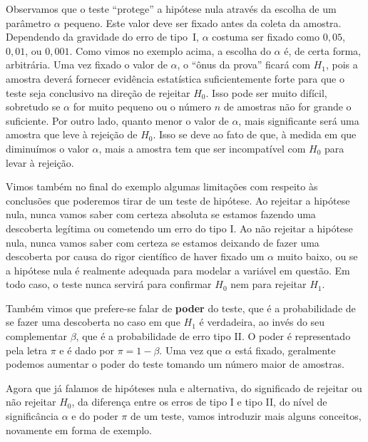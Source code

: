 \documentclass[12pt,a4paper]{article}
\theoremstyle{plain}
\theoremstyle{definition}
\theoremstyle{remark}
\begin{document}
Observamos que o teste ``protege'' a hipótese nula através da escolha de um parâmetro $\alpha$ pequeno.
Este valor deve ser fixado antes da coleta da amostra.
Dependendo da gravidade do erro de tipo~I, $\alpha$ costuma ser fixado como
$0,05$, $0,01$, ou $0,001$.
Como vimos no exemplo acima, a escolha do $\alpha$ é, de certa forma, arbitrária.
Uma vez fixado o valor de $\alpha$, o ``ônus da prova'' ficará com $H_1$, pois a amostra deverá fornecer evidência estatística suficientemente forte para que o teste seja conclusivo na direção de rejeitar $H_0$.
Isso pode ser muito difícil, sobretudo se $\alpha$ for muito pequeno ou o número $n$ de amostras não for grande o suficiente.
Por outro lado, quanto menor o valor de $\alpha$, mais significante será uma amostra que leve à rejeição de $H_0$. Isso se deve ao fato de que, à medida em que diminuímos o valor $\alpha$, mais a amostra tem que ser incompatível com $H_0$ para levar à rejeição.

Vimos também no final do exemplo algumas limitações com respeito às conclusões que poderemos tirar de um teste de hipótese.
Ao rejeitar a hipótese nula, nunca vamos saber com certeza absoluta se estamos fazendo uma descoberta legítima ou cometendo um erro do tipo I.
Ao não rejeitar a hipótese nula, nunca vamos saber com certeza se estamos deixando de fazer uma descoberta por causa do rigor científico de haver fixado um $\alpha$ muito baixo, ou se a hipótese nula é realmente adequada para modelar a variável em questão.
Em todo caso, o teste nunca servirá para confirmar $H_0$ nem para rejeitar $H_1$.

Também vimos que prefere-se falar de \textbf{poder} do teste, que é a probabilidade de se fazer uma descoberta no caso em que $H_1$ é verdadeira, ao invés do seu complementar $\beta$, que é a probabilidade de erro tipo II.
O poder é representado pela letra $\pi$ e é dado por $\pi = 1-\beta$.
Uma vez que $\alpha$ está fixado, geralmente podemos aumentar o poder do teste tomando um número maior de amostras.

Agora que já falamos de hipóteses nula e alternativa, do significado de rejeitar ou não rejeitar $H_0$, da diferença entre os erros de tipo I e tipo II, do nível de significância $\alpha$ e do poder $\pi$ de um teste, vamos introduzir mais alguns conceitos, novamente em forma de exemplo.
\end{document}
